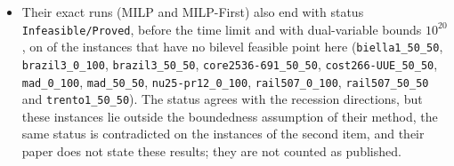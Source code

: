 \begin{itemize}
name the instance and their files hold no solutions; the point of \texttt{bobi
general} has this value, and the MIPLIB bound proves it optimal
(Section~\ref{app:general}). The optimum is therefore counted as published,
credited to their run file, with this package as an independent confirmation.
The same rule credits \texttt{neos-950242\_0\_100}, which their runs also report
optimal, to the earlier BOBILib release that listed it first. Their optima for
\texttt{ex10\_50\_50} (no point is known) and \texttt{mine-166-5\_50\_50} (their own
check file rejects the point) are not counted.
\item {\sloppy Their exact runs (MILP and MILP-First) also end with status
\texttt{Infeasible/Proved}, before the time limit and with dual-variable bounds
$10^{20}$, on \LsInfeasibleNoFeasible{} of the \NumNoFeasible{} instances that
have no bilevel feasible point here (\texttt{biella1\_50\_50},
\texttt{brazil3\_0\_100}, \texttt{brazil3\_50\_50}, \texttt{core2536-691\_50\_50},
\texttt{cost266-UUE\_50\_50}, \texttt{mad\_0\_100}, \texttt{mad\_50\_50},
\texttt{nu25-pr12\_0\_100}, \texttt{rail507\_0\_100}, \texttt{rail507\_50\_50} and
\texttt{trento1\_50\_50}). The status agrees with the recession directions, but
these instances lie outside the boundedness assumption of their method, the same
status is contradicted on the \LsInfeasibleVerifiedPoint{} instances of the second
item, and their paper does not state these results; they are not counted as
published.\par}
\end{itemize}

